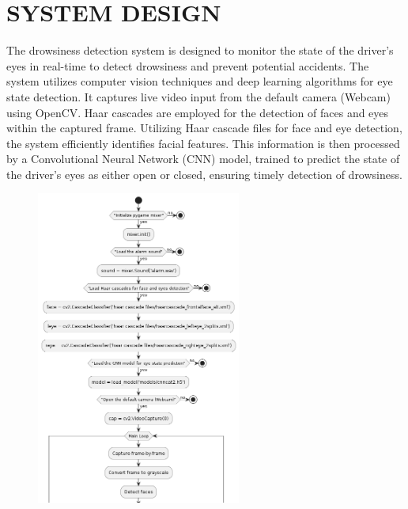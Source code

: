 \documentclass[12pt]{article}
\begin{document}
\section{SYSTEM DESIGN}

The drowsiness detection system is designed to monitor the state of the driver's eyes in real-time to detect drowsiness and prevent potential accidents. The system utilizes computer vision techniques and deep learning algorithms for eye state detection. It captures live video input from the default camera (Webcam) using OpenCV. Haar cascades are employed for the detection of faces and eyes within the captured frame. Utilizing Haar cascade files for face and eye detection, the system efficiently identifies facial features. This information is then processed by a Convolutional Neural Network (CNN) model, trained to predict the state of the driver's eyes as either open or closed, ensuring timely detection of drowsiness.
\vspace{0.2cm}
\begin{figure}[h]
\centering
\includegraphics[width=0.6\textwidth]{flow1}
\end{figure}
\FloatBarrier
\hfill
\end{document}
